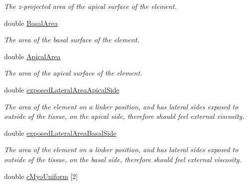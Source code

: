 \begin{DoxyCompactItemize}
\begin{DoxyCompactList}\small\item\em The z-\/projected area of the apical surface of the element. \end{DoxyCompactList}\item 
\hypertarget{classShapeBase_a2ae2b0b1dfd0672a39897e780d861254}{}double \hyperlink{classShapeBase_a2ae2b0b1dfd0672a39897e780d861254}{Basal\+Area}\label{classShapeBase_a2ae2b0b1dfd0672a39897e780d861254}

\begin{DoxyCompactList}\small\item\em The area of the basal surface of the element. \end{DoxyCompactList}\item 
\hypertarget{classShapeBase_adb4227c13db7e34dd1af182d143af47b}{}double \hyperlink{classShapeBase_adb4227c13db7e34dd1af182d143af47b}{Apical\+Area}\label{classShapeBase_adb4227c13db7e34dd1af182d143af47b}

\begin{DoxyCompactList}\small\item\em The area of the apical surface of the element. \end{DoxyCompactList}\item 
\hypertarget{classShapeBase_ac29dcfc319798bd21b3bc2b50ac401c8}{}double \hyperlink{classShapeBase_ac29dcfc319798bd21b3bc2b50ac401c8}{exposed\+Lateral\+Area\+Apical\+Side}\label{classShapeBase_ac29dcfc319798bd21b3bc2b50ac401c8}

\begin{DoxyCompactList}\small\item\em The area of the element on a linker position, and has lateral sides exposed to outside of the tissue, on the apical side, therefore should feel external viscosity. \end{DoxyCompactList}\item 
\hypertarget{classShapeBase_a3ba637ddf764ae673d616f7318270866}{}double \hyperlink{classShapeBase_a3ba637ddf764ae673d616f7318270866}{exposed\+Lateral\+Area\+Basal\+Side}\label{classShapeBase_a3ba637ddf764ae673d616f7318270866}

\begin{DoxyCompactList}\small\item\em The area of the element on a linker position, and has lateral sides exposed to outside of the tissue, on the basal side, therefore should feel external viscosity. \end{DoxyCompactList}\item 
\hypertarget{classShapeBase_a485e95cb1e7a440e57884d4df5ee1350}{}double \hyperlink{classShapeBase_a485e95cb1e7a440e57884d4df5ee1350}{c\+Myo\+Uniform} \mbox{[}2\mbox{]}\label{classShapeBase_a485e95cb1e7a440e57884d4df5ee1350}


\end{DoxyCompactItemize}
